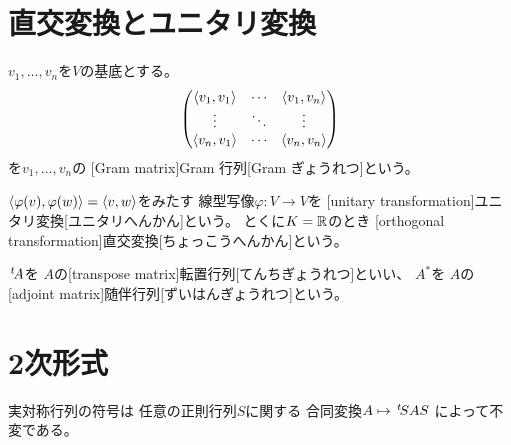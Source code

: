 \documentclass[report]{jlreq}
\begin{document}
%
\section{直交変換とユニタリ変換}

\begin{definition}[Gram 行列]
    $v_1, \dots, v_n$を$V$の基底とする。
    \begin{equation}
        \begin{pmatrix}
            \left\langle{v_1},{v_1}\right\rangle & \cdots & \left\langle{v_1},{v_n}\right\rangle \\
            \vdots & \ddots & \vdots \\
            \left\langle{v_n},{v_1}\right\rangle & \cdots & \left\langle{v_n},{v_n}\right\rangle
        \end{pmatrix}
    \end{equation}
    を$v_1, \dots, v_n$の
    [Gram matrix]{Gram 行列}[Gram ぎょうれつ]という。
\end{definition}

\begin{definition}[直交変換とユニタリ変換]
    $\left\langle{\varphi(v)},{\varphi(w)}\right\rangle = \left\langle{v},{w}\right\rangle$をみたす
    線型写像$\varphi \colon V \to V$を
    [unitary transformation]{ユニタリ変換}[ユニタリへんかん]という。
    とくに$K = \mathbb{R}$のとき
    [orthogonal transformation]{直交変換}[ちょっこうへんかん]という。
\end{definition}

\begin{definition}[対称行列と随伴行列]
    $\,{}^{t}\!A$を
    $A$の[transpose matrix]{転置行列}[てんちぎょうれつ]といい、
    $A^*$を
    $A$の[adjoint matrix]{随伴行列}[ずいはんぎょうれつ]という。
\end{definition}

%
\section{2次形式}

\begin{definition}[符号]
    \TODO{}
\end{definition}

\begin{theorem}
    \TODO{}
    実対称行列の符号は
    任意の正則行列$S$に関する
    合同変換$A \mapsto \,{}^{t}\!SAS$
    によって不変である。
\end{theorem}
\end{document}
